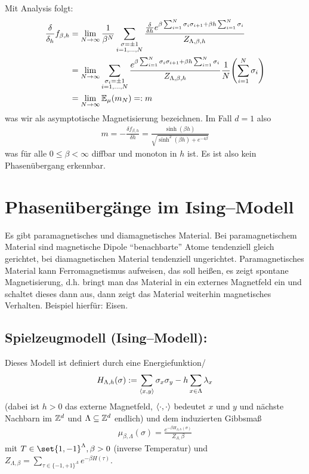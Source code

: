  Mit Analysis folgt:
 \begin{align}
 	\frac{\delta}{\delta_h}f_{\beta, h } &= \lim\limits_{N \to \infty} \frac{1}{\beta^N} \sum\limits_{\substack{\sigma = \pm1 \\ i = 1, \dots, N}} \frac{\frac{\delta}{\delta h} e^{\beta \sum_{i = 1}^{N} \sigma_i \sigma_{i+1} + \beta h \sum_{i =1}^{N} \sigma_i  }}{Z_{\Lambda, \beta, h}} \\
 		&= \lim\limits_{N \to \infty} \sum\limits_{\substack{\sigma_i = \pm 1 \\ i = 1,\dots,N}} \frac{e^{\beta \sum_{i = 1}^{N} \sigma_i \sigma_{i+1} + \beta h \sum_{i = 1}^{N} \sigma_i }}{Z_{\Lambda,\beta,h}} \frac{1}{N} \enb{\sum\limits_{i=1}^{N} \sigma_i} \\
 		&= \lim\limits_{N \to \infty} \EW{\relax}_{\mu}\enb{m_N} =: m
 \end{align}
 was wir als asymptotische Magnetisierung bezeichnen. Im Fall $d = 1$ also
 \begin{align}
 	m = - \frac{\delta f_{\beta,h}}{\delta h} = \frac{\sinh(\beta h)}{\sqrt{\sinh^2(\beta h) + e^{-4 \beta}}}
 \end{align}
 was für alle $0 \leq \beta < \infty$ diffbar und monoton in $h$ ist. Es ist also kein Phasenübergang erkennbar.


\section{Phasenübergänge im Ising--Modell}

Es gibt paramagnetisches und diamagnetisches Material. Bei paramagnetischem Material sind magnetische Dipole \enquote{benachbarte} Atome tendenziell gleich gerichtet, bei diamagnetischen Material tendenziell ungerichtet. Paramagnetisches Material kann Ferromagnetismus aufweisen, das soll heißen, es zeigt spontane Magnetisierung, d.h. bringt man das Material in ein externes Magnetfeld ein und schaltet dieses dann aus, dann zeigt das Material weiterhin magnetisches Verhalten. Beispiel hierfür: Eisen.
\subsection*{Spielzeugmodell (Ising--Modell):}
Dieses Modell ist definiert durch eine Energiefunktion/
\begin{align}
	H_{\Lambda,h} (\sigma) := \sum\limits_{\langle x,y\rangle} \sigma_x \sigma_y - h \sum\limits_{x \in \Lambda} \lambda_x
\end{align}
(dabei ist $h>0$ das externe Magnetfeld, $\langle\cdot,\cdot\rangle$ bedeutet $x$ und $y$ und nächste Nachbarn im $\mathbb{Z}^d$ und $\Lambda \subseteq \mathbb{Z}^d$ endlich) und dem induzierten Gibbsmaß 
\begin{align}
	\mu_{\beta,\Lambda}(\sigma) = \frac{e^{-\beta H_{\Lambda,h}(\sigma)}}{Z_{\Lambda,}\beta}
\end{align}
mit $T \in \set{1,-1}^{\Lambda}, \beta > 0$ (inverse Temperatur) und $Z_{\Lambda, \beta} = \sum\limits_{\tau \in \{-1,+1\}^{\Lambda}}e^{-\beta H(\tau)}$.

